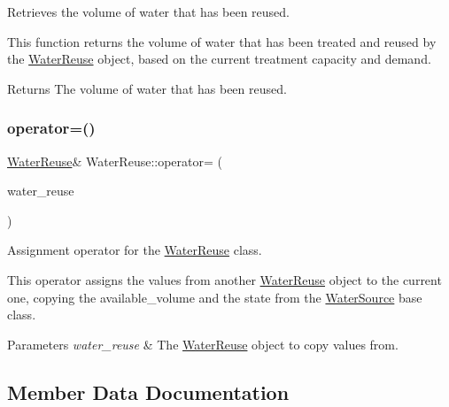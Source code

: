 Retrieves the volume of water that has been reused. 

This function returns the volume of water that has been treated and reused by the \mbox{\hyperlink{classWaterReuse}{Water\+Reuse}} object, based on the current treatment capacity and demand.

\begin{DoxyReturn}{Returns}
The volume of water that has been reused. 
\end{DoxyReturn}
\mbox{\label{classWaterReuse_ab0a905840bfc092d9bf9f69e94262948}} 
\subsubsection{\texorpdfstring{operator=()}{operator=()}}
{\footnotesize\ttfamily \mbox{\hyperlink{classWaterReuse}{Water\+Reuse}}\& Water\+Reuse\+::operator= (\begin{DoxyParamCaption}\item[{const \mbox{\hyperlink{classWaterReuse}{Water\+Reuse}} \&}]{water\+\_\+reuse }\end{DoxyParamCaption})}



Assignment operator for the \mbox{\hyperlink{classWaterReuse}{Water\+Reuse}} class. 

This operator assigns the values from another \mbox{\hyperlink{classWaterReuse}{Water\+Reuse}} object to the current one, copying the {\ttfamily available\+\_\+volume} and the state from the {\ttfamily \mbox{\hyperlink{classWaterSource}{Water\+Source}}} base class.


\begin{DoxyParams}{Parameters}
{\em water\+\_\+reuse} & The \mbox{\hyperlink{classWaterReuse}{Water\+Reuse}} object to copy values from. \\
\hline
\end{DoxyParams}


\subsection{Member Data Documentation}
\mbox{\label{classWaterReuse_a47ef62349f0092ccdda066905c89111a}} 
